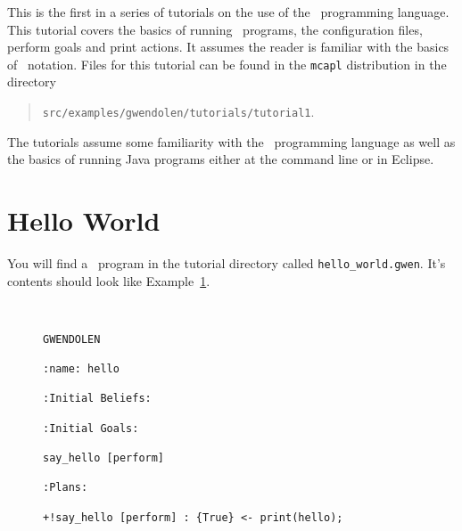 \label{tutorial:gwendolen:introduction}
This is the first in a series of tutorials on the use of the \gwendolen\ programming language.  This tutorial covers the basics of running \gwendolen\ programs, the configuration files, perform goals and print actions.  It assumes the reader is familiar with the basics of \prolog\ notation.
Files for this tutorial can be found in the
\texttt{mcapl} distribution in the directory
\begin{quote}
\texttt{src/examples/gwendolen/tutorials/tutorial1}.
\end{quote}
%
The tutorials assume some familiarity with the \prolog\ programming language as well as the basics of running Java programs either at the command line or in Eclipse.

\section{Hello World}

\begin{sloppypar}
You will find a \gwendolen\ program in the tutorial directory called \texttt{hello\_world.gwen}.  It's contents should look like Example~\ref{code:hello_world}.
\end{sloppypar}
\begin{figure}[htb]
\begin{ourexample}
\label{code:hello_world} \quad \\
\begin{lstlisting}[basicstyle=\footnotesize\sffamily,language=Gwendolen,style=easslisting]
GWENDOLEN

:name: hello

:Initial Beliefs:

:Initial Goals:

say_hello [perform]

:Plans:

+!say_hello [perform] : {True} <- print(hello);
\end{lstlisting}
\end{ourexample}
\end{figure}

